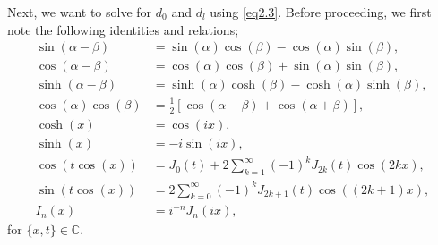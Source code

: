 \documentclass[aip,graphicx]{revtex4-1}
\newcommand{\lr}[1]{\left(#1\right)}
\newcommand{\lrsq}[1]{\left[ #1 \right]}
\newcommand{\besj}[2]{J_{#1}\lr{#2}}
\newcommand{\besi}[2]{I_{#1}\lr{#2}}
\newcommand{\complexes}{\mathbb{C}}
\begin{document}
Next, we want to solve for $d_0$ and $d_l$ using \eqref{eq2.3}. 
Before proceeding, we first note the following identities and relations;
	\begin{align}
	\sin\lr{\alpha-\beta}&=\sin\lr{\alpha}\cos\lr{\beta}-\cos\lr{\alpha}\sin\lr{\beta},\label{eq2.8}\\
	\cos\lr{\alpha-\beta}&=\cos\lr{\alpha}\cos\lr{\beta}+\sin\lr{\alpha}\sin\lr{\beta},\label{eq2.9}\\
	\sinh\lr{\alpha-\beta}&=\sinh\lr{\alpha}\cosh\lr{\beta}-\cosh\lr{\alpha}\sinh\lr{\beta},\label{eq2.10}\\
	\cos\lr{\alpha}\cos\lr{\beta}&=\frac{1}{2}\lrsq{\cos\lr{\alpha-\beta}+\cos\lr{\alpha+\beta}},\label{eq2.11}\\
	\cosh\lr{x}&=\cos\lr{i x},\label{eq2.12}\\
	\sinh\lr{x}&=-i\sin\lr{i x},\label{eq2.13}\\
	\cos\lr{t\cos\lr{x}}&=\besj{0}{t}+2\sum_{k=1}^{\infty}\lr{-1}^k\besj{2k}{t}\cos\lr{2kx},\label{eq2.14}\\
	\sin\lr{t\cos\lr{x}}&=2\sum_{k=0}^{\infty}\lr{-1}^k\besj{2k+1}{t}\cos\lr{\lr{2k+1}x},\label{eq2.15}\\
	\besi{n}{x}&=i^{-n}\besj{n}{ix},\label{eq2.16}
	\end{align}
        for $\{x,t\}\in\complexes$.\\
\end{document}
